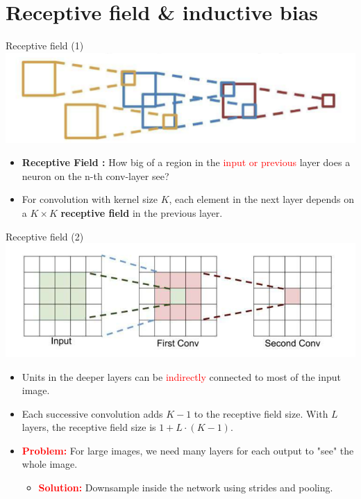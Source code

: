 \documentclass[default, aspectratio=169]{beamer}
\begin{document}
	

	\section{Receptive field \& inductive bias}
	
	\begin{frame}{Receptive field (1)}
		\centering
		\includegraphics[keepaspectratio, scale=0.6]{pic/receptive1.png}
		\smallskip
		\begin{itemize}
			\item \textbf{Receptive Field :} How big of a region in the \textcolor{red}{input or previous} layer does a neuron on the n-th conv-layer see?
			\item For convolution with kernel size $K$, each element in the next layer depends on a $K \times K$ \textbf{receptive field} in the previous layer.
		\end{itemize}
	\end{frame}	
	\begin{frame}{Receptive field (2)}
		\centering
		\includegraphics[keepaspectratio, scale=0.6]{pic/receptive.png}
		\smallskip
		\begin{itemize}
			\item Units in the deeper layers can be \textcolor{red}{indirectly} connected to most of the input image.
			\item Each successive convolution adds $K - 1$ to the receptive field size. With $L$ layers, the receptive field size is $1 + L \cdot (K - 1)$.
			\item \textcolor{red}{\textbf{Problem:}} For large images, we need many layers for each output to "see" the whole image.
			\begin{itemize}
				\item \textcolor{red}{\textbf{Solution:}} Downsample inside the network using strides and pooling.
			\end{itemize}
		\end{itemize}
	\end{frame}
\end{document}
